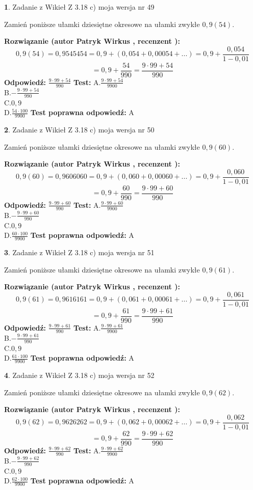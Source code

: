 \documentclass[12pt, a4paper]{article}
\theoremstyle{definition} %
\newtheorem{zad}{}
\newcommand{\zadStart}[1]{\begin{zad}#1\newline}
\newcommand{\zadStop}{\end{zad}}
\newcommand{\rozwStart}[2]{\noindent \textbf{Rozwiązanie (autor #1 , recenzent #2): }\newline}
\newcommand{\rozwStop}{\newline}
\newcommand{\odpStart}{\noindent \textbf{Odpowiedź:}\newline}
\newcommand{\odpStop}{\newline}
\newcommand{\testStart}{\noindent \textbf{Test:}\newline}
\newcommand{\testStop}{\newline}
\newcommand{\kluczStart}{\noindent \textbf{Test poprawna odpowiedź:}\newline}
\newcommand{\kluczStop}{\newline}
\begin{document}
\zadStart{Zadanie z Wikieł Z 3.18 c) moja wersja nr 49}

Zamień poniższe ułamki dziesiętne okresowe na ułamki zwykłe $0,9(54)$.
\zadStop
\rozwStart{Patryk Wirkus}{}
$$0,9(54)=0,9545454=0,9+(0,054+0,00054+...)=0,9+\frac{0,054}{1-0,01}$$
$$=0,9+\frac{54}{990}=\frac{9\cdot99+54}{990}$$
\rozwStop
\odpStart
$\frac{9\cdot99+54}{990}$
\odpStop
\testStart
A.$\frac{9\cdot99+54}{9900}$\\ B.$-\frac{9\cdot99+54}{990}$\\ C.$0,9$\\ D.$\frac{54\cdot100}{9900}$
\testStop
\kluczStart
A
\kluczStop



\zadStart{Zadanie z Wikieł Z 3.18 c) moja wersja nr 50}

Zamień poniższe ułamki dziesiętne okresowe na ułamki zwykłe $0,9(60)$.
\zadStop
\rozwStart{Patryk Wirkus}{}
$$0,9(60)=0,9606060=0,9+(0,060+0,00060+...)=0,9+\frac{0,060}{1-0,01}$$
$$=0,9+\frac{60}{990}=\frac{9\cdot99+60}{990}$$
\rozwStop
\odpStart
$\frac{9\cdot99+60}{990}$
\odpStop
\testStart
A.$\frac{9\cdot99+60}{9900}$\\ B.$-\frac{9\cdot99+60}{990}$\\ C.$0,9$\\ D.$\frac{60\cdot100}{9900}$
\testStop
\kluczStart
A
\kluczStop



\zadStart{Zadanie z Wikieł Z 3.18 c) moja wersja nr 51}

Zamień poniższe ułamki dziesiętne okresowe na ułamki zwykłe $0,9(61)$.
\zadStop
\rozwStart{Patryk Wirkus}{}
$$0,9(61)=0,9616161=0,9+(0,061+0,00061+...)=0,9+\frac{0,061}{1-0,01}$$
$$=0,9+\frac{61}{990}=\frac{9\cdot99+61}{990}$$
\rozwStop
\odpStart
$\frac{9\cdot99+61}{990}$
\odpStop
\testStart
A.$\frac{9\cdot99+61}{9900}$\\ B.$-\frac{9\cdot99+61}{990}$\\ C.$0,9$\\ D.$\frac{61\cdot100}{9900}$
\testStop
\kluczStart
A
\kluczStop



\zadStart{Zadanie z Wikieł Z 3.18 c) moja wersja nr 52}

Zamień poniższe ułamki dziesiętne okresowe na ułamki zwykłe $0,9(62)$.
\zadStop
\rozwStart{Patryk Wirkus}{}
$$0,9(62)=0,9626262=0,9+(0,062+0,00062+...)=0,9+\frac{0,062}{1-0,01}$$
$$=0,9+\frac{62}{990}=\frac{9\cdot99+62}{990}$$
\rozwStop
\odpStart
$\frac{9\cdot99+62}{990}$
\odpStop
\testStart
A.$\frac{9\cdot99+62}{9900}$\\ B.$-\frac{9\cdot99+62}{990}$\\ C.$0,9$\\ D.$\frac{62\cdot100}{9900}$
\testStop
\kluczStart
A
\kluczStop
\end{document}
